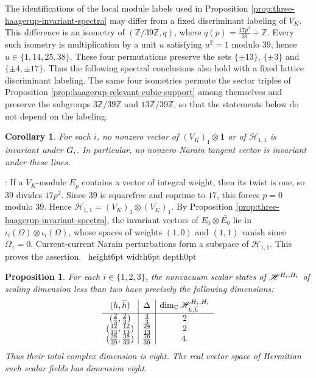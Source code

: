\documentclass[leqno]{article}
\newcommand{\Cbb}{\ensuremath{\mathbb{C}}}
\let\cal\relax
\newcommand{\cal}{\mathcal}
\newcommand{\Z}{\ensuremath{\mathbb{Z}}}
\newcommand{\qed}{\hfill \vrule height6pt  width6pt depth0pt}
\newcommand{\ot}{\otimes}
\newtheorem{prop}[thm]{Proposition}
\newtheorem{cor}[thm]{Corollary}
\newenvironment{proof}[1][]{\noindent {\it Proof #1} : }{\hbox{~}\qed
\smallskip
}
\numberwithin{equation}{section}
\begin{document}
The identifications of the local module labels used in Proposition \ref{prop:three-haagerup-invariant-spectra} may differ from a fixed discriminant labeling of $V_K$. This difference is an isometry of $(\Z/39\Z,q)$, where $q(p) = \frac{17p^2}{39}+\Z$. Every such isometry is multiplication by a unit $u$ satisfying $u^2 = 1$ modulo $39$, hence $u \in \{1,14,25,38\}$. These four permutations preserve the sets $\{\pm13\}$, $\{\pm3\}$ and $\{\pm4,\pm17\}$. Thus the following spectral conclusions also hold with a fixed lattice discriminant labeling. The same four isometries permute the sector triples of Proposition \ref{prop:haagerup-relevant-cubic-support} among themselves and preserve the subgroups $3\Z/39\Z$ and $13\Z/39\Z$, so that the statements below do not depend on the labeling.

\begin{cor}
\label{cor:haagerup-no-invariant-marginals}
For each $i$, no nonzero vector of $(V_K)_1\ot\overline{\mathbf1}$ or of $\mathscr H_{1,1}$ is invariant under $\cal G_i$. In particular, no nonzero Narain tangent vector is invariant under these lines.
\end{cor}

\begin{proof}
If a $V_K$-module $E_p$ contains a vector of integral weight, then its twist is one, so $39$ divides $17p^2$. Since $39$ is squarefree and coprime to $17$, this forces $p = 0$ modulo $39$. Hence $\mathscr H_{1,1} = (V_K)_1\ot\overline{(V_K)_1}$. By Proposition \ref{prop:three-haagerup-invariant-spectra}, the invariant vectors of $E_0\ot\overline{E_0}$ lie in $\iota_i(\Omega)\ot\overline{\iota_i(\Omega)}$, whose spaces of weights $(1,0)$ and $(1,1)$ vanish since $\Omega_1 = 0$. Current-current Narain perturbations form a subspace of $\mathscr H_{1,1}$. This proves the assertion.
\end{proof}

\begin{prop}
\label{prop:all-haagerup-invariant-relevant-fields}
For each $i \in \{1,2,3\}$, the nonvacuum scalar states of $\mathscr H^{\cal H_i,\cal H_i}$ of scaling dimension less than two have precisely the following dimensions:
\begingroup
\renewcommand{\arraystretch}{1.55}
\[
\begin{array}{c|c|c}
(h,\overline h)&\Delta&\dim_{\Cbb}\mathscr H_{h,\overline h}^{\cal H_i,\cal H_i}\\
\hline
(\frac23,\frac23)&\frac43&2\\
(\frac{12}{13},\frac{12}{13})&\frac{24}{13}&2\\
(\frac{38}{39},\frac{38}{39})&\frac{76}{39}&4.
\end{array}
\]
\endgroup
Thus their total complex dimension is eight. The real vector space of Hermitian such scalar fields has dimension eight.
\end{prop}
\end{document}
